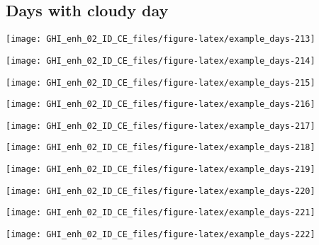 \documentclass[
  10pt,
  a4paper,oneside]{article}
\begin{document}
\FloatBarrier

\hypertarget{days-with-cloudy-day}{%
\subsection{Days with cloudy day}\label{days-with-cloudy-day}}

\begin{center}\texttt{[image: GHI\_enh\_02\_ID\_CE\_files/figure-latex/example\_days-213]} \end{center}

\begin{center}\texttt{[image: GHI\_enh\_02\_ID\_CE\_files/figure-latex/example\_days-214]} \end{center}

\begin{center}\texttt{[image: GHI\_enh\_02\_ID\_CE\_files/figure-latex/example\_days-215]} \end{center}

\begin{center}\texttt{[image: GHI\_enh\_02\_ID\_CE\_files/figure-latex/example\_days-216]} \end{center}

\begin{center}\texttt{[image: GHI\_enh\_02\_ID\_CE\_files/figure-latex/example\_days-217]} \end{center}

\begin{center}\texttt{[image: GHI\_enh\_02\_ID\_CE\_files/figure-latex/example\_days-218]} \end{center}

\begin{center}\texttt{[image: GHI\_enh\_02\_ID\_CE\_files/figure-latex/example\_days-219]} \end{center}

\begin{center}\texttt{[image: GHI\_enh\_02\_ID\_CE\_files/figure-latex/example\_days-220]} \end{center}

\begin{center}\texttt{[image: GHI\_enh\_02\_ID\_CE\_files/figure-latex/example\_days-221]} \end{center}

\begin{center}\texttt{[image: GHI\_enh\_02\_ID\_CE\_files/figure-latex/example\_days-222]} \end{center}
\end{document}
